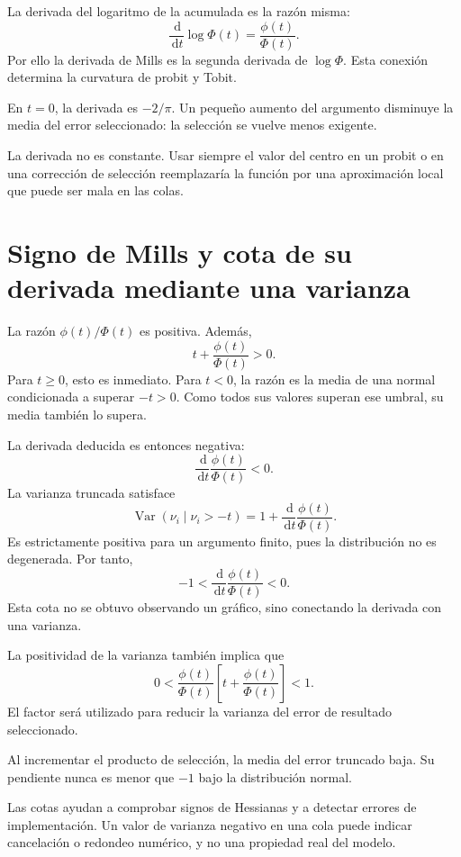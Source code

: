 \documentclass[11pt,a4paper]{article}
\newcommand{\dd}{\,\mathrm d}
\DeclareMathOperator{\Var}{Var}
\begin{document}
La derivada del logaritmo de la acumulada
es la razón misma:
\[
\frac{\dd}{\dd t}\log\Phi(t)=\frac{\phi(t)}{\Phi(t)}.
\]
Por ello la derivada de Mills
es la segunda derivada de \(\log\Phi\).
Esta conexión determina
la curvatura de probit y Tobit.

\begin{ejemplo}[Centro]
En \(t=0\), la derivada es \(-2/\pi\).
Un pequeño aumento del argumento
disminuye la media del error seleccionado:
la selección se vuelve menos exigente.
\end{ejemplo}
La derivada no es constante.
Usar siempre el valor del centro
en un probit o en una corrección de selección
reemplazaría la función por
una aproximación local que
puede ser mala en las colas.


\clearpage
\section{Signo de Mills y cota de su derivada mediante una varianza}

La razón \(\phi(t)/\Phi(t)\) es positiva.
Además,
\[
t+\frac{\phi(t)}{\Phi(t)}>0.
\]
Para \(t\ge0\), esto es inmediato.
Para \(t<0\), la razón es
la media de una normal condicionada
a superar \(-t>0\).
Como todos sus valores superan
ese umbral, su media también lo supera.

La derivada deducida es entonces negativa:
\[
\frac{\dd}{\dd t}\frac{\phi(t)}{\Phi(t)}<0.
\]
La varianza truncada satisface
\[
\Var(\nu_i\mid\nu_i>-t)
=1+\frac{\dd}{\dd t}\frac{\phi(t)}{\Phi(t)}.
\]
Es estrictamente positiva para
un argumento finito, pues la
distribución no es degenerada.
Por tanto,
\[
-1<
\frac{\dd}{\dd t}\frac{\phi(t)}{\Phi(t)}
<0.
\]
Esta cota no se obtuvo observando
un gráfico, sino conectando
la derivada con una varianza.

La positividad de la varianza
también implica que
\[
0<
\frac{\phi(t)}{\Phi(t)}
\left[t+\frac{\phi(t)}{\Phi(t)}\right]
<1.
\]
El factor será utilizado
para reducir la varianza del
error de resultado seleccionado.

\begin{ejemplo}
Al incrementar el producto de selección,
la media del error truncado baja.
Su pendiente nunca es menor que \(-1\)
bajo la distribución normal.
\end{ejemplo}
Las cotas ayudan a comprobar
signos de Hessianas y a detectar
errores de implementación.
Un valor de varianza negativo
en una cola puede indicar
cancelación o redondeo numérico,
y no una propiedad real del modelo.
\end{document}
